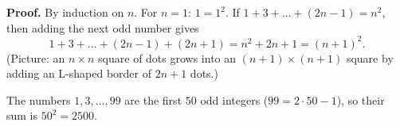\textbf{Proof.} By induction on $n$. For $n=1$: $1=1^2$. If $1+3+\dots+(2n-1)=n^2$, then adding the next odd number gives
\[
1+3+\dots+(2n-1)+(2n+1)=n^2+2n+1=(n+1)^2 .
\]
(Picture: an $n\times n$ square of dots grows into an $(n+1)\times(n+1)$ square by adding an L-shaped border of $2n+1$ dots.)

The numbers $1,3,\dots,99$ are the first $50$ odd integers ($99=2\cdot50-1$), so their sum is $50^2=\boxed{2500}$.
